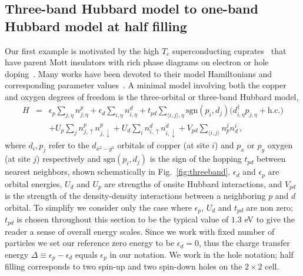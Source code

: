 \subsection{Three-band Hubbard model to one-band Hubbard model at half filling}
\label{subsection:3band} 
Our first example is motivated by the high $T_c$ superconducting cuprates~\cite{Bednorz1986} that 
have parent Mott insulators with rich phase diagrams on electron or hole doping~\cite{Dagotto_RevModPhys, LeeWen_RevModPhys}. 
Many works have been devoted to their model Hamiltonians and corresponding parameter 
values~\cite{tJSpalek, Pavirini, Emery, ZhangRice, Hybertsen_PRB1989, Hybertsen_PRB1990, Kent_Hubbard}. 
A minimal model involving both the copper and oxygen degrees of freedom 
is the three-orbital or three-band Hubbard model, 
\begin{eqnarray}
H &=&    \epsilon_p \sum_{j,\eta} n^{p}_{j,\eta} + \epsilon_{d} \sum_{i,\eta}  n^{d}_{i,\eta} 
	+ t_{pd} \sum_{\langle i,j \rangle, \eta} \text{sgn}(p_i,d_j) \Big( d_{i,\eta}^{\dagger} p_{j,\eta} + \text{h.c.} \Big) \nonumber \\
  & &   + U_p \sum_{j} n^{p}_{j,\uparrow} n^{p}_{j,\downarrow} + U_d \sum_{i} n^{d}_{i,\uparrow} n^{d}_{i,\downarrow} + V_{pd} \sum_{\langle i,j \rangle} n^{j}_p n^{i}_d\,,
\end{eqnarray}
where $d_i,p_j$ refer to the  $d_{x^2 - y^2}$ orbitals of copper (at site $i$) and $p_x$ or $p_y$ 
oxygen (at site $j$)  respectively and $\text{sgn}(p_i,d_j)$ is the sign of the hopping $t_{pd}$ 
between nearest neighbors, shown schematically in Fig.~\ref{fig:threeband}. 
$\epsilon_d$ and $\epsilon_p$ are orbital energies, $U_d$ and $U_p$ are strengths of onsite Hubbard interactions,  
and $V_{pd}$ is the strength of the density-density interactions between a neighboring $p$ and $d$ orbital. 
To simplify we consider only the case where $\epsilon_p$, $U_d$ and $t_{pd}$ are non zero; $t_{pd}$ is chosen throughout this section to be the typical value of $1.3$ eV to give the reader a sense of overall energy scales. 
Since we work with fixed number of particles we set our reference zero energy to be $\epsilon_d = 0$, thus the charge transfer energy $\Delta \equiv \epsilon_p - \epsilon_d$ equals $\epsilon_p$ in our notation. 
We work in the hole notation; half filling corresponds to two spin-up and two spin-down holes on the $2\times2$ cell.


